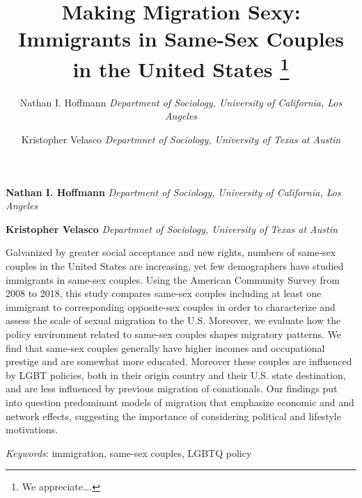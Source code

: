\documentclass[11pt,]{article}
\title{Making Migration Sexy: Immigrants in Same-Sex Couples in the United States \thanks{We appreciate\ldots.}  }
\author{\Large Nathan I. Hoffmann\vspace{0.05in} \newline\normalsize\emph{Department of Sociology, University of California, Los Angeles}   \and \Large Kristopher Velasco\vspace{0.05in} \newline\normalsize\emph{Departmnet of Sociology, University of Texas at Austin}  }
\date{}
\newcommand*{\authorfont}{\fontfamily{phv}\selectfont}
\renewenvironment{abstract}
 {{%
    \setlength{\leftmargin}{0mm}
    \setlength{\rightmargin}{\leftmargin}%
  }%
  \relax}
 {\endlist}
\begin{document}
	
%

{%
\setlength{\parindent}{0pt}
\thispagestyle{plain}
{\fontsize{18}{20}\selectfont\raggedright 
\maketitle  %

}

{
   \vskip 13.5pt\relax \normalsize\fontsize{11}{12} 
\textbf{\authorfont Nathan I. Hoffmann} \hskip 15pt \emph{\small Department of Sociology, University of California, Los Angeles}   \par \textbf{\authorfont Kristopher Velasco} \hskip 15pt \emph{\small Departmnet of Sociology, University of Texas at Austin}   

}

}








\begin{abstract}

    \hbox{\vrule height .2pt width 39.14pc}

    \vskip 8.5pt %

\noindent Galvanized by greater social acceptance and new rights, numbers of same-sex couples in the United States are increasing, yet few demographers have studied immigrants in same-sex couples. Using the American Community Survey from 2008 to 2018, this study compares same-sex couples including at least one immigrant to corresponding opposite-sex couples in order to characterize and assess the scale of sexual migration to the U.S. Moreover, we evaluate how the policy environment related to same-sex couples shapes migratory patterns. We find that same-sex couples generally have higher incomes and occupational prestige and are somewhat more educated. Moreover these couples are influenced by LGBT policies, both in their origin country and their U.S. state destination, and are less influenced by previous migration of conationals. Our findings put into question predominant models of migration that emphasize economic and and network effects, suggesting the importance of considering political and lifestyle motivations.


\vskip 8.5pt \noindent \emph{Keywords}: immigration, same-sex couples, LGBTQ policy \par

    \hbox{\vrule height .2pt width 39.14pc}



\end{abstract}
\end{document}
